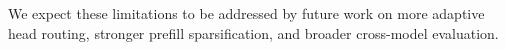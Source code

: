 We expect these limitations to be addressed by future work on more adaptive head routing, stronger prefill sparsification, and broader cross-model evaluation.




